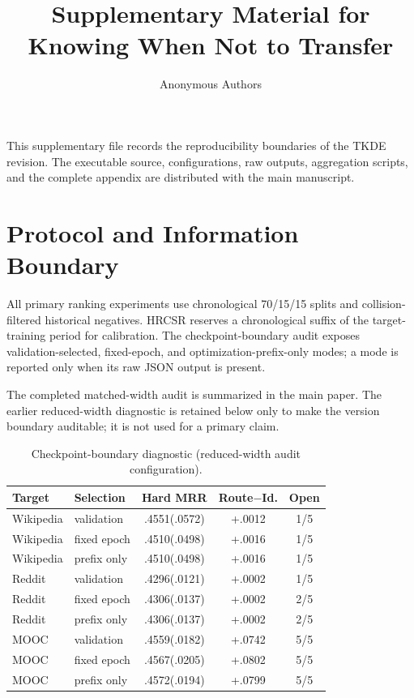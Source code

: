 \documentclass[conference]{IEEEtran}
\title{Supplementary Material for Knowing When Not to Transfer}
\author{Anonymous Authors}
\begin{document}
\maketitle

This supplementary file records the reproducibility boundaries of the TKDE
revision.  The executable source, configurations, raw outputs, aggregation
scripts, and the complete appendix are distributed with the main manuscript.

\section{Protocol and Information Boundary}
All primary ranking experiments use chronological 70/15/15 splits and
collision-filtered historical negatives.  HRCSR reserves a chronological
suffix of the target-training period for calibration.  The checkpoint-boundary
audit exposes validation-selected, fixed-epoch, and optimization-prefix-only
modes; a mode is reported only when its raw JSON output is present.

The completed matched-width audit is summarized in the main paper. The earlier
reduced-width diagnostic is retained below only to make the version boundary
auditable; it is not used for a primary claim.

\begin{table}[h]
\centering
\caption{Checkpoint-boundary diagnostic (reduced-width audit configuration).}
\label{tab:checkpoint_boundary_supp}
\scriptsize
\begin{tabular}{llccc}
\toprule
Target & Selection & Hard MRR & Route$-$Id. & Open \\
\midrule
Wikipedia & validation & .4551(.0572) & +.0012 & 1/5 \\
Wikipedia & fixed epoch & .4510(.0498) & +.0016 & 1/5 \\
Wikipedia & prefix only & .4510(.0498) & +.0016 & 1/5 \\
Reddit & validation & .4296(.0121) & +.0002 & 1/5 \\
Reddit & fixed epoch & .4306(.0137) & +.0002 & 2/5 \\
Reddit & prefix only & .4306(.0137) & +.0002 & 2/5 \\
MOOC & validation & .4559(.0182) & +.0742 & 5/5 \\
MOOC & fixed epoch & .4567(.0205) & +.0802 & 5/5 \\
MOOC & prefix only & .4572(.0194) & +.0799 & 5/5 \\
\bottomrule
\end{tabular}
\end{table}
\end{document}
